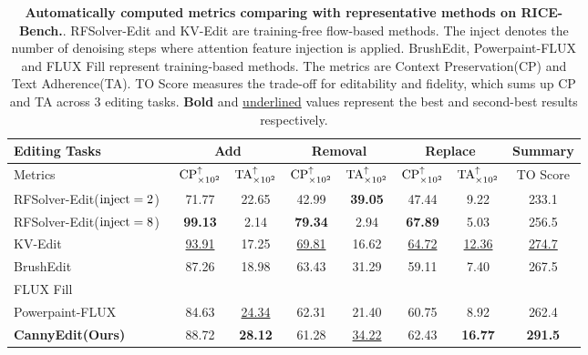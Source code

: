 \documentclass{article}
\begin{document}
\begin{table}[h]
\begin{center} 
\footnotesize
\setlength{\tabcolsep}{1.70mm} %
\caption{\textbf{Automatically computed metrics comparing with representative methods on RICE-Bench.}. RFSolver-Edit and KV-Edit are training-free flow-based methods. The inject denotes the number of denoising steps where attention feature injection is applied. BrushEdit, Powerpaint-FLUX and FLUX Fill represent training-based methods. The metrics are Context Preservation(CP) and Text Adherence(TA). TO Score measures the trade-off for editability and fidelity, which sums up CP and TA across 3 editing tasks. \textbf{Bold} and \underline{underlined} values represent the best and second-best results respectively.}
\begin{tabular}{l|cc|cc|cc|c}
\toprule
\multirow{2}{*}[0.8ex]{Editing Tasks} & \multicolumn{2}{c|}{Add} & \multicolumn{2}{c|}{Removal} &\multicolumn{2}{c|}{Replace} & Summary\\
\midrule
 Metrics & $\textup{CP}_{\times 10^2}^{\uparrow}$ & $\textup{TA}_{\times 10^2}^{\uparrow}$ & $\textup{CP}_{\times 10^2}^{\uparrow}$ & $\textup{TA}_{\times 10^2}^{\uparrow}$ & $\textup{CP}_{\times 10^2}^{\uparrow}$ & $\textup{TA}_{\times 10^2}^{\uparrow}$ & TO Score\\
\midrule
RFSolver-Edit($\textup{inject}=2$)~\cite{wang2024taming} & 71.77 & 22.65 & 42.99 & \textbf{39.05} & 47.44 & 9.22 & 233.1\\
RFSolver-Edit($\textup{inject}=8$)~\cite{wang2024taming} & \textbf{99.13} & 2.14 & \textbf{79.34} & 2.94 & \textbf{67.89} & 5.03 & 256.5\\
KV-Edit~\cite{zhu2025kv} & \underline{93.91} & 17.25 & \underline{69.81} & 16.62 & \underline{64.72} & \underline{12.36} & \underline{274.7}\\
BrushEdit~\cite{li2024brushedit} & 87.26 & 18.98 & 63.43 & 31.29 & 59.11 & 7.40 & 267.5\\
FLUX Fill~\cite{blackforest2024FLUX} & & & & & & & \\
Powerpaint-FLUX~\cite{zhuang2023task} & 84.63 & \underline{24.34} & 62.31 & 21.40 & 60.75 & 8.92 & 262.4\\
\midrule
\textbf{CannyEdit(Ours)} & 88.72 & \textbf{28.12} & 61.28 & \underline{34.22} & 62.43 & \textbf{16.77} & \textbf{291.5}\\
\bottomrule
\end{tabular}
\label{tab:rice-comparison} 
\end{center}
\end{table}
\end{document}
